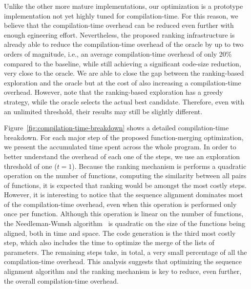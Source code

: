 Unlike the other more mature implementations, our optimization is a prototype
implementation not yet highly tuned for compilation-time.
For this reason, we believe that the compilation-time overhead can be reduced
even further with enough egineering effort.
Nevertheless, the proposed ranking infrastructure is already able to reduce the
compilation-time overhead of the oracle by up to two orders of magnitude, i.e.,
an average compilation-time overhead of only 20\% compared to the baseline,
while still achieving a significant code-size reduction, very close to the
oracle.
We are able to close the gap between the ranking-based exploration and the
oracle but at the cost of also increasing a compilation-time overhead.
However, note that the ranking-based exploration has a greedy strategy, while
the oracle selects the actual best candidate.
Therefore, even with an unlimited threshold, their results may still be slightly
different.

Figure~\ref{fig:compilation-time-breakdown} shows a detailed compilation-time
breakdown.
For each major step of the proposed function-merging optimization, we present
the accumulated time spent across the whole program.
In order to better understand the overhead of each one of the steps, we use
an exploration threshold of one ($t = 1$). 
Because the ranking mechanism is performs a quadratic operation on the number of
functions, computing the similarity between all pairs of functions, it is
expected that ranking would be amongst the most costly steps.
However, it is interesting to notice that the sequence alignment dominates most
of the compilation-time overhead, even when this operation is performed only
once per function.
Although this operation is linear on the number of functions, the
Needleman-Wunsh algorithm~\cite{needleman70} is quadratic on the size of the
functions being aligned, both in time and space.
The code generation is the third most costly step, which also includes the time
to optimize the merge of the lists of parameters.
The remaining steps take, in total, a very small percentage of all the
compilation-time overhead.
This analysis suggests that optimizing the sequence alignment algorithm and
the ranking mechanism is key to reduce, even further, the overall
compilation-time overhead.

